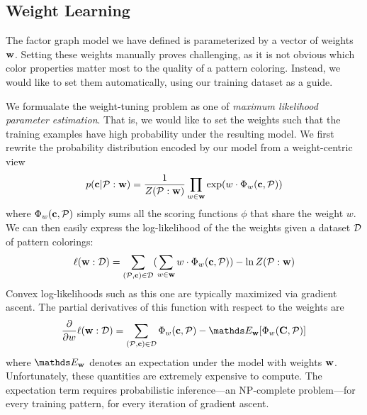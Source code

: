 \subsection{Weight Learning}
\label{sec:weights}

The factor graph model we have defined is parameterized by a vector of weights $\mathbf{w}$. Setting these weights manually proves challenging, as it is not obvious which color properties matter most to the quality of a pattern coloring. Instead, we would like to set them automatically, using our training dataset as a guide.

We formualate the weight-tuning problem as one of \emph{maximum likelihood parameter estimation}. That is, we would like to set the weights such that the training examples have high probability under the resulting model. We first rewrite the probability distribution encoded by our model from a weight-centric view
\begin{equation*}
p(\mathbf{c} | \mathcal{P} : \mathbf{w}) = \frac{1}{Z(\mathcal{P} : \mathbf{w})} \prod_{w \in \mathbf{w}} \exp(w \cdot \Phi_w(\mathbf{c}, \mathcal{P}))
\end{equation*}
where $\Phi_w(\mathbf{c}, \mathcal{P})$ simply sums all the scoring functions $\phi$ that share the weight $w$. We can then easily express the log-likelihood of the the weights given a dataset $\mathcal{D}$ of pattern colorings:
\begin{equation*}
\ell(\mathbf{w} : \mathcal{D}) =
	\sum_{(\mathcal{P}, \mathbf{c}) \in \mathcal{D}}
	(
		\sum_{w \in \mathbf{w}}
			w \cdot \Phi_w(\mathbf{c}, \mathcal{P})
	)			
		- \ln{Z(\mathcal{P}: \mathbf{w})}
\end{equation*}
Convex log-likelihoods such as this one are typically maximized via gradient ascent. The partial derivatives of this function with respect to the weights are
\begin{equation*}
\frac{\partial}{\partial w} \ell(\weights : \dataset) = 
	\sum_{(\pattern, \colors) \in \dataset}
			\weightStats(\colors, \pattern)
		- \expectation_\weights[\weightStats(\colorVars, \pattern)]
\end{equation*}
where $\expectation_\weights$ denotes an expectation under the model with weights $\mathbf{w}$. Unfortunately, these quantities are extremely expensive to compute. The expectation term requires probabilistic inference---an NP-complete problem---for every training pattern, for every iteration of gradient ascent.

